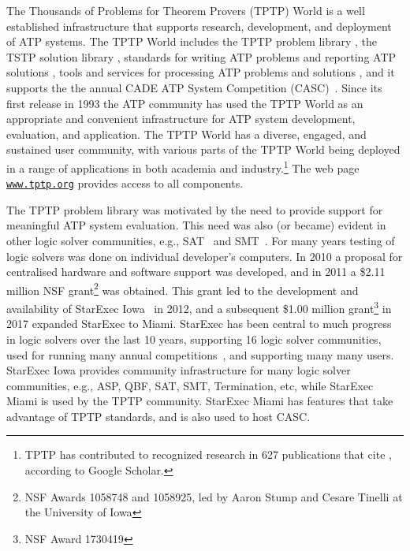 \documentclass{easychair}
\begin{document}
The Thousands of Problems for Theorem Provers (TPTP) World \cite{Sut24} is a well established 
infrastructure that supports research, development, and deployment of ATP systems.
The TPTP World includes 
the TPTP problem library \cite{Sut17},
the TSTP solution library \cite{Sut10},
standards for writing ATP problems and reporting ATP solutions \cite{SS+06,Sut08-KEAPPA},
tools and services for processing ATP problems and solutions \cite{Sut10},
and it supports the the annual CADE ATP System Competition (CASC)~\cite{Sut16}.
Since its first release in 1993 the ATP community has used the TPTP World as an appropriate and 
convenient infrastructure for ATP system development, evaluation, and application.
The TPTP World has a diverse, engaged, and sustained user community, with various parts of the 
TPTP World being deployed in a range of applications in both academia and industry.\footnote{%
TPTP has contributed to recognized research in 627 publications that cite \cite{Sut17},
according to Google Scholar.}
The web page \href{https://www.tptp.org}{\tt www.tptp.org} provides access to all components.

The TPTP problem library was motivated by the need to provide support for meaningful ATP system 
evaluation.
This need was also (or became) evident in other logic solver communities, e.g., 
SAT~\cite{HS00-SATLIB} and SMT~\cite{BST10}.
For many years testing of logic solvers was done on individual developer's computers. 
In 2010 a proposal for centralised hardware and software support was developed,
and in 2011 a \$2.11 million NSF grant\footnote{%
NSF Awards 1058748 and 1058925, led by Aaron Stump and Cesare Tinelli at the University of Iowa} 
was obtained.
This grant led to the development and availability of StarExec Iowa~\cite{SST14} in 2012,
and a subsequent \$1.00 million grant\footnote{%
NSF Award 1730419} in 2017 expanded StarExec to Miami.
StarExec has been central to much progress in logic solvers over the last 10 years, supporting
16 logic solver communities, used for running many annual competitions~\cite{BB+19}, and 
supporting many many users.
StarExec Iowa provides community infrastructure for many logic solver communities,
e.g., ASP, QBF, SAT, SMT, Termination, etc, while
StarExec Miami is used by the TPTP community.
StarExec Miami has features that take advantage of TPTP standards, and is also used to host CASC.
\end{document}
